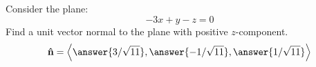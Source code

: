 \documentclass{ximera}
\author{Bart Snapp}
\begin{document}
\begin{exercise}
Consider the plane:
\[
-3x+y-z=0
\]
Find a unit vector normal to the plane with positive $z$-component.
\[
\unormal = \vector{\answer{3/\sqrt{11}},\answer{-1/\sqrt{11}},\answer{1/\sqrt{11}}}
\]
\end{exercise}
\end{document}

